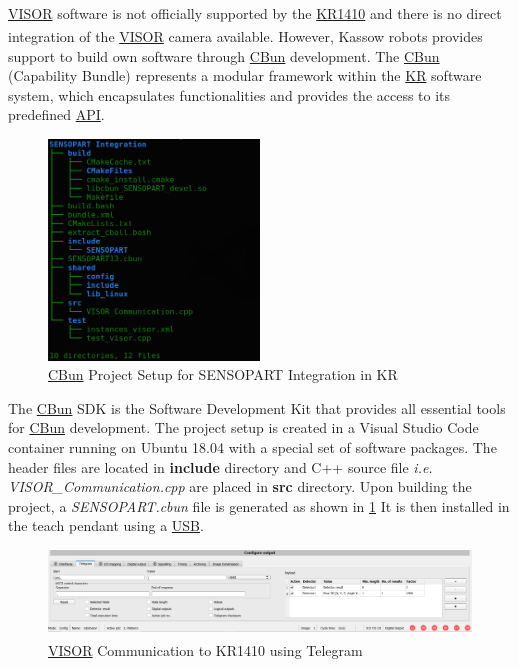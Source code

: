 \hyperref[acro:VISOR]{VISOR}\textsuperscript{\textregistered} software is not officially supported by the \hyperref[acro:KR]{KR1410} and there is no direct integration of the \hyperref[acro:VISOR]{VISOR}\textsuperscript{\textregistered} camera available.
However, Kassow robots provides support to build own software through \hyperref[acro:CBun]{CBun} development.
The \hyperref[acro:CBun]{CBun} (Capability Bundle) represents a modular framework within the \hyperref[acro:KR]{KR} software system,
which encapsulates functionalities and provides the
access to its predefined \hyperref[acro:API]{API}.


\begin{figure}[h]
    \centering
    \includegraphics[width=0.5\textwidth]{figures/sensopart-development.png}
    \caption{\hyperref[acro:CBun]{CBun} Project Setup for SENSOPART Integration in KR}
    \label{fig:sensopart-development}
\end{figure}


The \hyperref[acro:CBun]{CBun} SDK is the Software Development Kit that provides all essential tools
for \hyperref[acro:CBun]{CBun} development. The project setup is created in a Visual Studio Code container
running on Ubuntu 18.04 with a special set of software packages. \cite{Cbun}
The header files are located in \textbf{include} directory and C++ source file \textit{i.e.}     \textit{VISOR\_Communication.cpp}
are placed in \textbf{src} directory.
Upon building the project, a \textit{SENSOPART.cbun} file is generated as shown in \ref{fig:sensopart-development}
It is then installed in the teach pendant using a \hyperref[acro:USB]{USB}.

\begin{figure}[h]
    \centering
    \includegraphics[width=1\textwidth]{figures/telegram-output.png}
    \caption{\hyperref[acro:VISOR]{VISOR}\textsuperscript{\textregistered} Communication to KR1410 using Telegram}
    \label{fig:visor-communication}
\end{figure}

